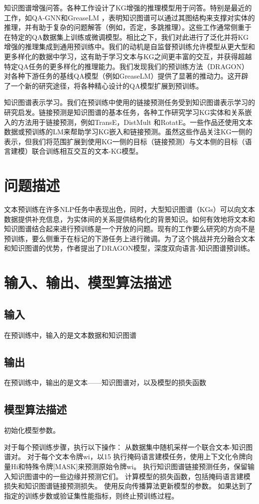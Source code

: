 知识图谱增强问答。各种工作设计了KG增强的推理模型用于问答。特别是最近的工作，如QA-GNN和GreaseLM ，表明知识图谱可以通过其图结构来支撑对实体的推理，并有助于复杂的问题解答（例如，否定，多跳推理）。这些工作通常侧重于在特定的QA数据集上训练或微调模型。相比之下，我们对此进行了泛化并将KG增强的推理集成到通用预训练中。我们的动机是自监督预训练允许模型从更大型和更多样化的数据中学习，这有助于学习文本与KG之间更丰富的交互，并获得超越特定QA任务的更多样化的推理能力。我们发现我们的预训练方法（DRAGON）对各种下游任务的基线QA模型（例如GreaseLM）提供了显著的推动力。这开辟了一个新的研究途径，将各种精心设计的QA模型扩展到预训练。

知识图谱表示学习。我们在预训练中使用的链接预测任务受到知识图谱表示学习的研究启发。链接预测是知识图谱的基本任务，各种工作研究学习KG实体和关系嵌入的方法用于链接预测，例如TransE，DistMult 和RotatE。一些作品还使用文本数据或预训练的LM来帮助学习KG嵌入和链接预测。虽然这些作品关注KG一侧的表示，但我们将范围扩展到使用KG一侧的目标（链接预测）与文本侧的目标（语言建模）联合训练相互交互的文本-KG模型。

\section{问题描述}
文本预训练在许多NLP任务中表现出色，同时，大型知识图谱（KGs）可以向文本数据提供补充信息，为实体间的关系提供结构化的背景知识。如何有效地将文本和知识图谱结合起来进行预训练是一个开放的问题。现有的工作要么研究的方向不是预训练，要么侧重于在标记的下游任务上进行微调。为了这个挑战并充分融合文本和知识图谱的优势，作者提出了DRAGON模型，深度双向语言-知识图谱预训练。

\section{输入、输出、模型算法描述}
\subsection{输入}
在预训练中，输入的是文本数据和知识图谱
\subsection{输出}
在预训练中，输出的是文本——知识图谱对，以及模型的损失函数
\subsection{模型算法描述}
初始化模型参数。

对于每个预训练步骤，执行以下操作：
从数据集中随机采样一个联合文本-知识图谱对。
对于每个文本令牌wi，以15%
执行掩码语言建模任务，使用上下文化令牌向量{Hi}和特殊令牌[MASK]来预测原始令牌{wi}。
执行知识图谱链接预测任务，保留输入知识图谱中的一些边缘并预测它们。
计算模型的损失函数，包括掩码语言建模损失和知识图谱链接预测损失。
使用反向传播算法更新模型的参数。
如果达到了指定的训练步数或验证集性能指标，则终止预训练过程。

